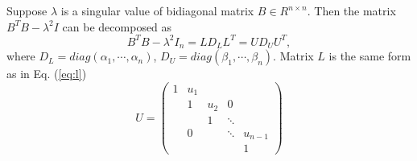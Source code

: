 Suppose $\lambda$ is a singular value of bidiagonal matrix $B \in R^{n \times n}$.
Then the matrix $B^T B - \lambda^2 I$ can be decomposed as
\begin{equation}
B^T B - \lambda^2 I_n = L D_L L^T = U D_U U^T ,
\end{equation}
where $D_L=diag(\alpha_1, \cdots, \alpha_n)$, $D_U = diag(\beta_1, \cdots, \beta_n)$. Matrix $L$ is the same form as in Eq. (\ref{eq:l})
\begin{equation}
 U =  \left( \begin{array}{ccccc}
  1 & u_{1}&       &       &  \\
    & 1    & u_{2} & 0     &  \\
    &      & 1     & \ddots&  \\
    & 0    &       & \ddots& u_{n-1} \\
    &      &       &       & 1
 \end{array} \right)
\end{equation}

